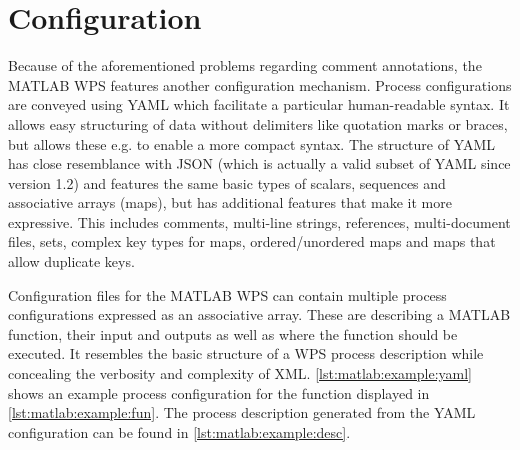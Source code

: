 \section{Configuration}
  \label{sec:matlab:conf}
  Because of the aforementioned problems regarding comment annotations, the MATLAB WPS features another configuration mechanism. Process configurations are conveyed using YAML \citep{yaml} which facilitate a particular human-readable syntax. It allows easy structuring of data without delimiters like quotation marks or braces, but allows these e.g. to enable a more compact syntax. The structure of YAML has close resemblance with JSON (which is actually a valid subset of YAML since version 1.2) and features the same basic types of scalars, sequences and associative arrays (maps), but has additional features that make it more expressive. This includes comments, multi-line strings, references, multi-document files, sets, complex key types for maps, ordered/unordered maps and maps that allow duplicate keys.
  
  Configuration files for the MATLAB WPS can contain multiple process configurations expressed as an associative array. These are describing a MATLAB function, their input and outputs as well as where the function should be executed. It resembles the basic structure of a WPS process description while concealing the verbosity and complexity of XML. \cref{lst:matlab:example:yaml} shows an example process configuration for the function displayed in \cref{lst:matlab:example:fun}. The process description generated from the YAML configuration can be found in \cref{lst:matlab:example:desc}.

